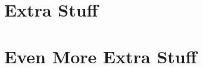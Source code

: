 \appendix
\label{chap:Appendix}

\chapter{Extra Stuff}
\blindtext

\chapter{Even More Extra Stuff}
\blindtext